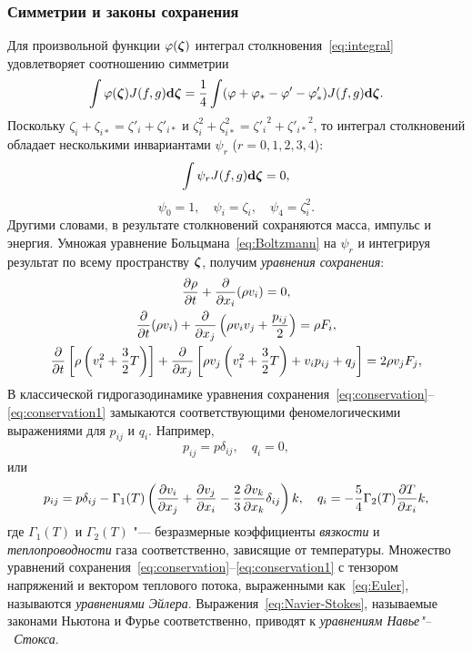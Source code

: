 
\subsubsection{Симметрии и законы сохранения}

Для произвольной функции \(\varphi(\bzeta)\) интеграл столкновения~\eqref{eq:integral}
удовлетворяет соотношению симметрии
\begin{equation}\label{eq:ci_symmetry}
    \int\varphi(\bzeta)J(f,g)\dzeta = \frac14\int(\varphi+\varphi_*-\varphi'-\varphi'_*) J(f,g)\dzeta.
\end{equation}
Поскольку \(\zeta_i+\zeta_{i*}=\zeta'_i+\zeta'_{i*}\) и \(\zeta_i^2+\zeta_{i*}^2={\zeta'_i}^2+{\zeta'_{i*}}^{\!\!2}\),
то интеграл столкновений обладает несколькими инвариантами \(\psi_r\) (\(r=0, 1, 2, 3, 4\)):
\begin{equation}\label{eq:conser_moments}
    \int \psi_r J(f,g)\dzeta = 0,
\end{equation}
\begin{equation}\label{eq:def_psi}
    \psi_0 = 1, \quad \psi_i = \zeta_i, \quad \psi_4 = \zeta_i^2.
\end{equation}
Другими словами, в результате столкновений сохраняются масса, импульс и энергия.
Умножая уравнение Больцмана~\eqref{eq:Boltzmann} на \(\psi_r\)
и интегрируя результат по всему пространству \(\bzeta\), получим \emph{уравнения сохранения}:
\begin{gather}\label{eq:conservation}
    \pder[\rho]{t} + \pder{x_i}(\rho v_i) = 0, \\
    \pder{t}(\rho v_i) + \pder{x_j}\left( \rho v_i v_j + \frac{p_{ij}}2 \right) = \rho F_i, \\
    \pder{t}\left[ \rho\left( v_i^2 + \frac32T \right) \right]
        + \pder{x_j}\left[ \rho v_j\left( v_i^2 + \frac32T \right) + v_i p_{ij} + q_j \right]
        = 2\rho v_j F_j, \label{eq:conservation1}
\end{gather}
В классической гидрогазодинамике уравнения сохранения~\eqref{eq:conservation}--\eqref{eq:conservation1}
замыкаются соответствующими феномелогическими выражениями для \(p_{ij}\) и \(q_i\). Например,
\begin{equation}\label{eq:Euler}
    p_{ij} = p\delta_{ij}, \quad q_i = 0,
\end{equation}
или
\begin{equation}\label{eq:Navier-Stokes}
    p_{ij} = p\delta_{ij} - \Gamma_1(T)\left( \pder[v_i]{x_j} + \pder[v_j]{x_i}
        - \frac23\pder[v_k]{x_k}\delta_{ij} \right)k, \quad
    q_i = -\frac54\Gamma_2(T)\pder[T]{x_i}k,
\end{equation}
где \(\Gamma_1(T)\) и \(\Gamma_2(T)\) "--- безразмерные коэффициенты \emph{вязкости}
и \emph{теплопроводности} газа соответственно, зависящие от температуры.
Множество уравнений сохранения~\eqref{eq:conservation}--\eqref{eq:conservation1}
с тензором напряжений и вектором теплового потока, выраженными как~\eqref{eq:Euler},
называются \emph{уравнениями Эйлера}. Выражения~\eqref{eq:Navier-Stokes},
называемые законами Ньютона и Фурье соответственно,
приводят к \emph{уравнениям Навье"--~Стокса}.

